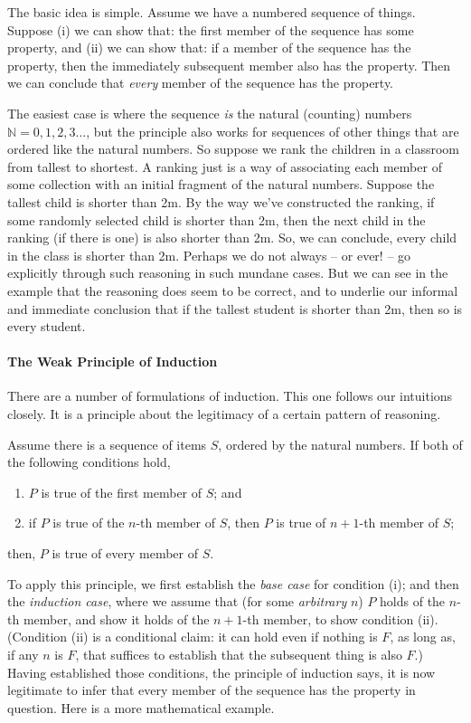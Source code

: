 The basic idea is simple. Assume we have a numbered sequence of things. Suppose (i) we can show that: the first member of the sequence has some property, and (ii) we can show that: if a member of the sequence has the property, then the immediately subsequent member also has the property. Then we can conclude that \emph{every} member of the sequence has the property.

The easiest case is where the sequence \emph{is} the natural (counting) numbers $\mathbb{N} = 0, 1, 2, 3…$, but the principle also works for sequences of other things that are ordered like the natural numbers. So suppose we rank the children in a classroom from tallest to shortest. A ranking just is a way of associating each member of some collection with an initial fragment of the natural numbers. Suppose the tallest child is shorter than 2m. By the way we've constructed the ranking, if some randomly selected child is shorter than 2m, then the next child in the ranking (if there is one) is also shorter than 2m. So, we can conclude, every child in the class is shorter than 2m. Perhaps we do not always – or ever! – go explicitly through such reasoning in such mundane cases. But we can see in the example that the reasoning does seem to be correct, and to underlie our informal and immediate conclusion that if the tallest student is shorter than 2m, then so is every student.  


\paragraph{The Weak Principle of Induction}

There are a number of formulations of induction. This one follows our intuitions closely. It is a principle about the legitimacy of a certain pattern of reasoning.

 \begin{definition}
 Assume there is a sequence of items $S$, ordered by the natural numbers. If both of the following conditions hold, \begin{enumerate}
   \item $P$ is true of the first
    member of $S$; and 
    \item  if $P$
    is true of the $n$-th member of $S$, then $P$ is true of $n+1$-th member of $S$;
 \end{enumerate} then, $P$ is true of every member of $S$.\end{definition}

To apply this principle, we first establish the \emph{base case} for condition (i); and then the \emph{induction case}, where we assume that (for some \emph{arbitrary} $n$) $P$ holds of the $n$-th member, and show it holds of the $n+1$-th member, to show condition (ii). (Condition (ii) is a conditional claim: it can hold even if nothing is $F$, as long as, if any $n$ is $F$, that suffices to establish that the subsequent thing is also $F$.) Having established those conditions, the principle of induction says, it is now legitimate to infer that every member of the sequence has the property in question. Here is a more mathematical example.


